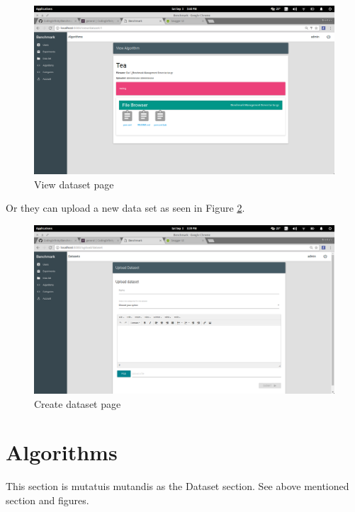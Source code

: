 \documentclass[11pt,a4paper]{article}
\begin{document}
\begin{figure}[H]
	\begin{center}
		\includegraphics[scale=0.3]{../Images/User Manual/View Dataset.png}
		\caption{View dataset page}
		\label{fig:viewData}
	\end{center}  
\end{figure}
\clearpage
Or they can upload a new data set as seen in Figure \ref {fig:createData}.
\begin{figure}[H]
	\begin{center}
		\includegraphics[scale=0.3]{../Images/User Manual/Upload Dataset.png}
		\caption{Create dataset page}
		\label{fig:createData}
	\end{center}  
\end{figure}
\clearpage
\section{Algorithms}
This section is mutatuis mutandis as the Dataset section. See above mentioned section and figures.
\end{document}
